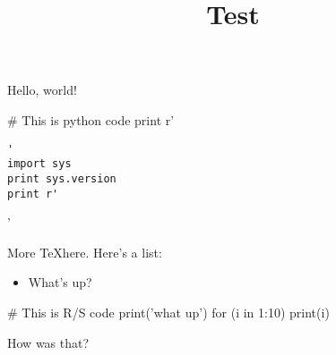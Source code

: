 \documentclass{article}
\title{Test}
\begin{document}
Hello, world!

\begin{python}
# This is python code
print r'\begin{verbatim}'
import sys
print sys.version
print r'\end{verbatim}'
\end{python}

More \TeX here. Here's a list:
\begin{itemize}
\item What's up?
\end{itemize}

\begin{Scode}
# This is R/S code
print('what up')
for (i in 1:10) { print(i) }
\end{Scode}

How was that?
\end{document}
